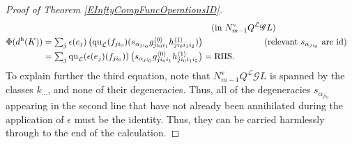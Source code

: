 \documentclass[11pt]{amsart} \renewcommand{\baselinestretch}{1.2}
\theoremstyle{plain}
\numberwithin{equation}{section} %
\theoremstyle{plain}
\numberwithin{equation}{chapter} %
\newcommand{\scrG}{\mathscr{G}}
\newcommand{\call}{\mathcal{L}}
\newcommand{\BSW}{{\scrG}}
\newcommand{\quadratic}{\mathrm{qu}}
\newcommand{\Id}{\mathrm{id}}
\newcommand{\uver}{^\mathrm{v}}
\newcommand{\uhor}{^\mathrm{h}}
\begin{document}
\begin{Operations in composite functor spectral sequences}
\begin{proof}[Proof of Theorem \ref{EInftyCompFuncOperationsID}]
\begin{alignat*}{2}
&\qquad&\text{\!\!\!\!\!\!\!\!(in $N\uver_{m-1}Q^{\call}\BSW L)$}\\
\Phi(d\uhor(K))&=
\textstyle\sum_j \epsilon (e_j)\left( {\quadratic_\call}(f_{ji_0})(s_{\alpha_{ji_0}}g^{\smash{\langle} 0\smash{\rangle}}_{ji_0i_1}h^{\smash{\langle} 1\smash{\rangle}}_{ji_0i_1i_2})\right)%
&\qquad&\text{\!\!\!\!\!\!\!\!(relevant $s_{\alpha_{ji_0}}$ are $\Id$)}\\
&=
\textstyle\sum_j {\quadratic_\call}(\epsilon (e_j)(f_{ji_0}))\left(s_{\alpha_{ji_0}} {g^{\smash{\langle} 0\smash{\rangle}}_{ji_0i_1}h^{\smash{\langle} 1\smash{\rangle}}_{ji_0i_1i_2}}\right) ={}\makebox[0cm][l]{\textup{RHS}.}
\end{alignat*}
To explain further the third equation, note that $N\uver_{m-1}Q^{\call}\BSW L$ is spanned by the classes $k_{\cdots }$, and none of  their degeneracies. Thus, all of the degeneracies $s_{\alpha_{ji_0}}$ appearing in the second line that have not already been annihilated during the application of $\epsilon$ must be the identity. Thus, they can be carried harmlessly through to the end of the calculation.
\end{proof}













\end{Operations in composite functor spectral sequences}
\end{document}
